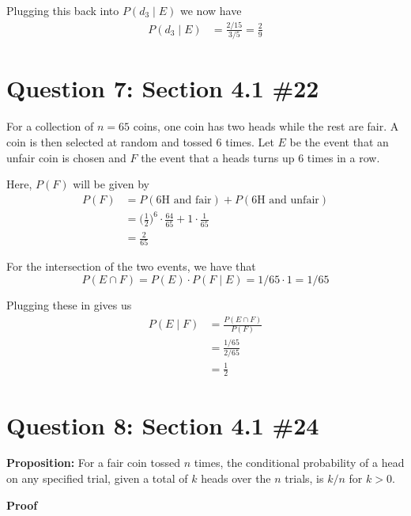 \documentclass[11pt, oneside]{article}   	%
\begin{document}
Plugging this back into $P(d_3 \mid E)$ we now have
	\begin{align*}
		P(d_3 \mid E) & = \frac{2/15}{3/5} = \frac{2}{9}
	\end{align*}

\section*{Question 7: Section 4.1 \#22}

For a collection of $n=65$ coins, one coin has two heads while the rest are fair. A coin is then selected at random and tossed 6 times. Let $E$ be the event that an unfair coin is chosen and $F$ the event that a heads turns up 6 times in a row.

Here, $P(F)$ will be given by
	\begin{align*}
		P(F) & = P(\text{6H and fair}) + P(\text{6H and unfair})\\
		& = \Big(\frac{1}{2}\Big)^6\cdot \frac{64}{65} + 1 \cdot \frac{1}{65} \\
		& = \frac{2}{65}
	\end{align*}


For the intersection of the two events, we have that
$$P(E \cap F) = P(E) \cdot P(F \mid E) = 1/65 \cdot 1 = 1/65$$

Plugging these in gives us
	\begin{align*}
		P(E \mid F) & = \frac{P(E \cap F)}{P(F)} \\
		& = \frac{1/65}{2/65} \\
		& = \frac{1}{2}
	\end{align*}

\section*{Question 8: Section 4.1 \#24}

\textbf{Proposition:} For a fair coin tossed $n$ times, the conditional probability of a head on any specified trial, given a total of $k$ heads over the $n$ trials, is $k/n$ for $k > 0$.

\textbf{Proof}
\end{document}
